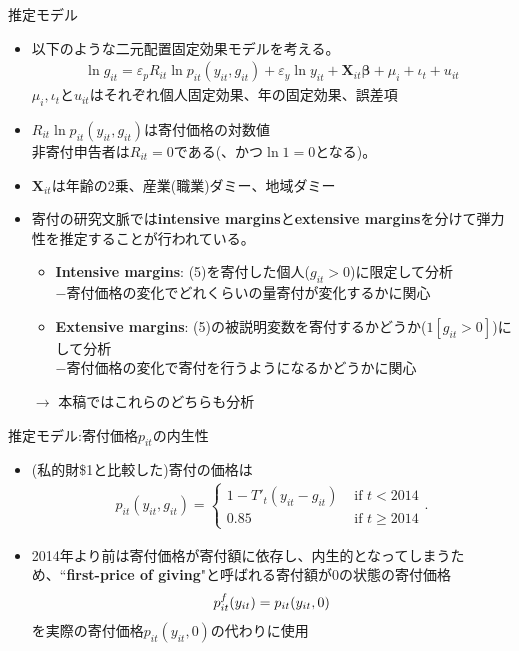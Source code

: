 \documentclass[dvipdfmx,10pt]{beamer}
\begin{document}
\begin{frame}{推定モデル}
	\begin{itemize}
		\item 以下のような二元配置固定効果モデルを考える。
		\begin{align}
			\ln g_{it} = \varepsilon_pR_{it} \ln p_{it}(y_{it}, g_{it}) + \varepsilon_y \ln y_{it} + \bm{X}_{it}\bm{\beta} + \mu_i + \iota_t + u_{it}\tag{5}
		\end{align}
	$\mu_i, \iota_t$と$ u_{it}$はそれぞれ個人固定効果、年の固定効果、誤差項 
	\item $R_{it} \ln p_{it}(y_{it}, g_{it})$は寄付価格の対数値\\
	非寄付申告者は$R_{it}=0$である(、かつ$\ln 1=0$となる)。
	\item $\bm{X}_{it}$は年齢の2乗、産業(職業)ダミー、地域ダミー
	\item 寄付の研究文脈では\textbf{intensive margins}と\textbf{extensive margins}を分けて弾力性を推定することが行われている。
	\begin{itemize}
		\item \textbf{Intensive margins}: (5)を寄付した個人($g_{it}>0$)に限定して分析\\
		$-$寄付価格の変化でどれくらいの量寄付が変化するかに関心
		\item \textbf{Extensive margins}: (5)の被説明変数を寄付するかどうか($1[g_{it}>0]$)にして分析\\
		$-$寄付価格の変化で寄付を行うようになるかどうかに関心
	\end{itemize}
	$\to$ 本稿ではこれらのどちらも分析
	\end{itemize}
\end{frame}

\begin{frame}{推定モデル:寄付価格$p_{it}$の内生性}
	\begin{itemize}
		\item (私的財\$1と比較した)寄付の価格は
		\begin{align}
			p_{it}(y_{it}, g_{it})=\begin{cases}
			1-T'_t(y_{it}-g_{it})&\text{ if }t<2014\\
			0.85&\text{ if }t\ge2014
			\end{cases}
			\tag{6'}.
		\end{align}
		\item 2014年より前は寄付価格が寄付額に依存し、内生的となってしまうため、``\textbf{first-price of giving}"と呼ばれる寄付額が0の状態の寄付価格
		\begin{align}
			p_{it}^f(y_{it})=p_{it}(y_{it},0)\notag
		\end{align}
		を実際の寄付価格$p_{it}(y_{it},0)$の代わりに使用
	\end{itemize}
\end{frame}
\end{document}
